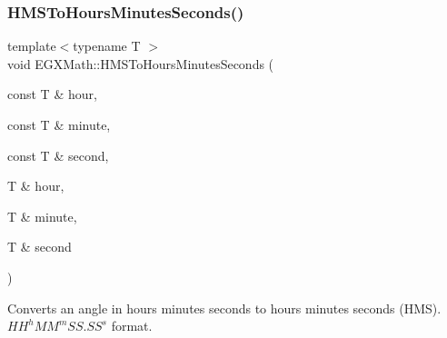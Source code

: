 \subsubsection{\texorpdfstring{H\+M\+S\+To\+Hours\+Minutes\+Seconds()}{HMSToHoursMinutesSeconds()}}
{\footnotesize\ttfamily template$<$typename T $>$ \\
void E\+G\+X\+Math\+::\+H\+M\+S\+To\+Hours\+Minutes\+Seconds (\begin{DoxyParamCaption}\item[{const T \&}]{hour,  }\item[{const T \&}]{minute,  }\item[{const T \&}]{second,  }\item[{T \&}]{hour,  }\item[{T \&}]{minute,  }\item[{T \&}]{second }\end{DoxyParamCaption})}



Converts an angle in hours minutes seconds to hours minutes seconds (H\+MS). ${HH}^h{MM}^m{SS.SS}^s$ format. 

